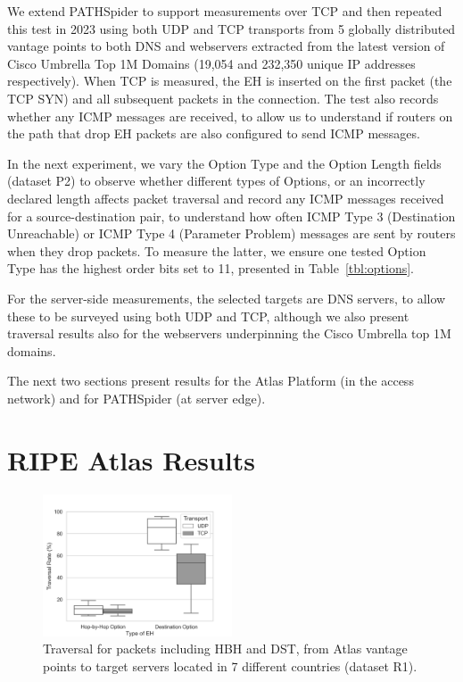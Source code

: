 \documentclass[conference]{IEEEtran}
\begin{document}
We extend PATHSpider to support measurements over TCP and then repeated this test in 2023 using both UDP and TCP transports from 5 globally distributed vantage points to both DNS and webservers extracted from the latest version of Cisco Umbrella Top 1M Domains (19,054 and 232,350 unique IP addresses respectively). When TCP is measured, the EH is inserted on the first packet (the TCP SYN) and all subsequent packets in the connection.
The test also records whether any ICMP messages are received, to allow us to understand if routers on the path that drop EH packets are also configured to send ICMP messages.

In the next experiment, we vary the Option Type and the Option Length fields (dataset P2) to observe whether different types of Options, or an incorrectly declared length affects packet traversal and record any ICMP messages received
for a source-destination pair, to understand how often ICMP Type 3 (Destination Unreachable) or ICMP Type 4 (Parameter Problem) messages are sent by routers when they drop packets. To measure the latter, we ensure one tested Option Type has the highest order bits set to 11, presented in Table~\ref{tbl:options}.

For the server-side measurements, the selected targets are DNS servers, to allow these to be surveyed using both UDP and TCP, although we also present traversal results also for the webservers underpinning the Cisco Umbrella top 1M domains.

The next two sections present results for the Atlas Platform  (in the access network) and for PATHSpider (at server edge).


\section{RIPE Atlas Results} 
\label{sec:ripe-results}

\begin{figure}[t]
\centering
  \includegraphics[width=0.5\textwidth]{all_traversal.png}
  \caption{Traversal for packets including HBH and DST, from Atlas vantage points to target servers located in 7 different countries (dataset R1).}
  \label{fig:countrybox}
\end{figure}
\end{document}
